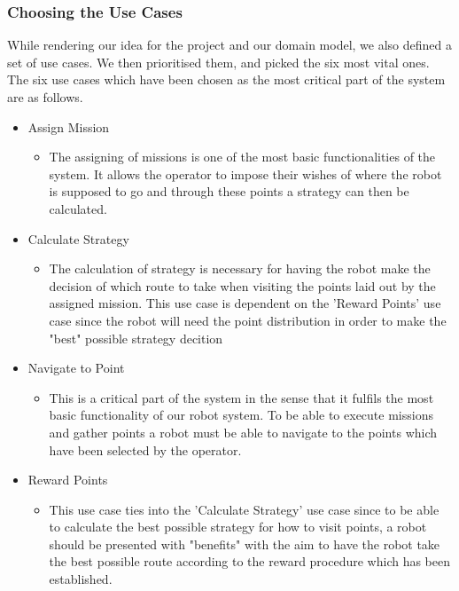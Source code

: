 \subsubsection*{Choosing the Use Cases}
While rendering our idea for the project and our domain model, we also defined a set of use cases. We then prioritised them, and picked the six most vital ones.
The six use cases which have been chosen as the most critical part of the system are as follows.
\begin{itemize}
    \item Assign Mission
      \begin{itemize}
          \item The assigning of missions is one of the most basic functionalities of the system. It allows the operator to impose their wishes of where the robot is supposed to go and through these points a strategy can then be calculated.
      \end{itemize}
    \item Calculate Strategy
      \begin{itemize}
          \item The calculation of strategy is necessary for having the robot make the decision of which route to take when visiting the points laid out by the assigned mission. This use case is dependent on the 'Reward Points' use case since the robot will need the point distribution in order to make the "best" possible strategy decition 
      \end{itemize}
    \item Navigate to Point
     \begin{itemize}
         \item This is a critical part of the system in the sense that it fulfils the most basic functionality of our robot system. To be able to execute missions and gather points a robot must be able to navigate to the points which have been selected by the operator.
     \end{itemize}
    \item Reward Points
      \begin{itemize}
          \item This use case ties into the 'Calculate Strategy' use case since to be able to calculate the best possible strategy for how to visit points, a robot should be presented with "benefits" with the aim to have the robot take the best possible route according to the reward procedure which has been established.
      \end{itemize}

\end{itemize}
